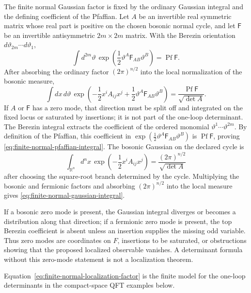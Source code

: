The finite normal Gaussian factor is fixed by the ordinary Gaussian integral
and the defining coefficient of the Pfaffian.  Let \(A\) be an invertible real
symmetric matrix whose real part is positive
on the chosen bosonic normal cycle, and let \(\mathsf F\) be an invertible
antisymmetric \(2m\times2m\) matrix.  With the Berezin orientation
\(d\vartheta_{2m}\cdots d\vartheta_1\),
\begin{equation}
  \int d^{2m}\vartheta\,
  \exp\!\left(\frac12\vartheta^A\mathsf F_{AB}\vartheta^B\right)
  =
  \operatorname{Pf}\mathsf F .
  \label{eq:finite-normal-pfaffian-integral}
\end{equation}
After absorbing the ordinary factor \((2\pi)^{n/2}\) into the local
normalization of the bosonic measure,
\begin{equation}
  \int dx\,d\vartheta\,
  \exp\!\left(
    -\frac12x^iA_{ij}x^j
    +\frac12\vartheta^A\mathsf F_{AB}\vartheta^B
  \right)
  =
  \frac{\operatorname{Pf}\mathsf F}{\sqrt{\det A}} .
  \label{eq:finite-normal-gaussian-integral}
\end{equation}
If \(A\) or \(\mathsf F\) has a zero mode, that direction must be split off
and integrated on the fixed locus or saturated by insertions; it is not part
of the one-loop determinant.
The Berezin integral extracts the coefficient of the ordered monomial
\(\vartheta^1\cdots\vartheta^{2m}\).  By definition of the Pfaffian,
this coefficient in
\(\exp(\frac12\vartheta^A\mathsf F_{AB}\vartheta^B)\) is
\(\operatorname{Pf}\mathsf F\), proving
\eqref{eq:finite-normal-pfaffian-integral}.  The bosonic Gaussian on the
declared cycle is
\[
  \int_{\mathbb R^n}d^nx\,
  \exp\!\left(-\frac12x^iA_{ij}x^j\right)
  =
  \frac{(2\pi)^{n/2}}{\sqrt{\det A}}
\]
after choosing the square-root branch determined by the cycle.  Multiplying
the bosonic and fermionic factors and absorbing \((2\pi)^{n/2}\) into the
local measure gives \eqref{eq:finite-normal-gaussian-integral}.

If a bosonic zero mode is present, the Gaussian integral diverges or becomes
a distribution along that direction; if a fermionic zero mode is present,
the top Berezin coefficient is absent unless an insertion supplies the
missing odd variable.  Thus zero modes are coordinates on \(F\), insertions
to be saturated, or obstructions showing that the proposed localized
observable vanishes.  A determinant formula without this zero-mode statement
is not a localization theorem.

Equation~\eqref{eq:finite-normal-localization-factor} is the finite model for
the one-loop determinants in the compact-space QFT examples below.

